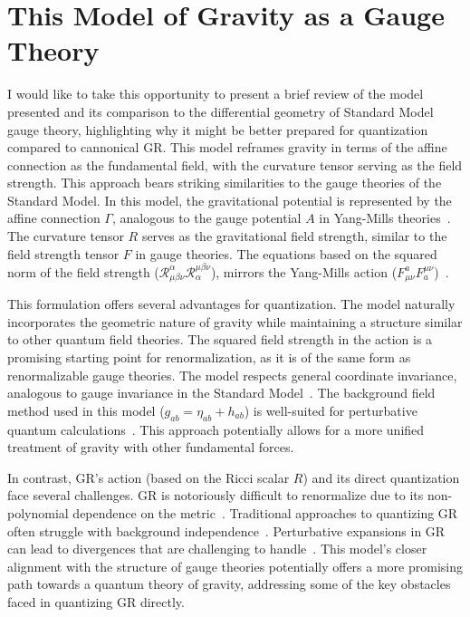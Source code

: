\documentclass[aps,prd,preprint]{revtex4-1}
\begin{document}
\section{This Model of Gravity as a Gauge Theory}
I would like to take this opportunity to present a brief review of the model presented and its comparison to the differential geometry of Standard Model gauge theory, highlighting why it might be better prepared for quantization compared to cannonical GR. This model reframes gravity in terms of the affine connection as the fundamental field, with the curvature tensor serving as the field strength. This approach bears striking similarities to the gauge theories of the Standard Model. In this model, the gravitational potential is represented by the affine connection $\Gamma$, analogous to the gauge potential $A$ in Yang-Mills theories~\cite{peskin_1995,hauser_2019_1,hauser_2019_2,hauser_2019_3}. The curvature tensor $R$ serves as the gravitational field strength, similar to the field strength tensor $F$ in gauge theories. The equations based on the squared norm of the field strength ($\mathcal{R}^\alpha_{\mu\beta\nu}\mathcal{R}_\alpha^{\mu\beta\nu}$), mirrors the Yang-Mills action ($F^{a}_{\mu\nu} F_{a}^{\mu\nu}$)~\cite{peskin_1995}.

This formulation offers several advantages for quantization. The model naturally incorporates the geometric nature of gravity while maintaining a structure similar to other quantum field theories. The squared field strength in the action is a promising starting point for renormalization, as it is of the same form as renormalizable gauge theories. The model respects general coordinate invariance, analogous to gauge invariance in the Standard Model~\cite{hauser_2019_1,hauser_2019_2,hauser_2019_3}. The background field method used in this model ($g_{ab} = \eta_{ab} + h_{ab}$) is well-suited for perturbative quantum calculations~\cite{bern_2002}. This approach potentially allows for a more unified treatment of gravity with other fundamental forces.

In contrast, GR's action (based on the Ricci scalar $R$) and its direct quantization face several challenges. GR is notoriously difficult to renormalize due to its non-polynomial dependence on the metric~\cite{deser_2009}. Traditional approaches to quantizing GR often struggle with background independence~\cite{reuter_2009,ashtekar_2009,ashtekar_2004,read_2023}. Perturbative expansions in GR can lead to divergences that are challenging to handle~\cite{deser_1957}. This model's closer alignment with the structure of gauge theories potentially offers a more promising path towards a quantum theory of gravity, addressing some of the key obstacles faced in quantizing GR directly.
\end{document}
